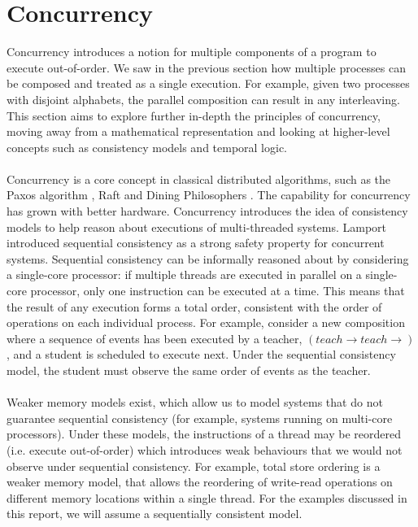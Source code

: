 \section{Concurrency} \label{sec:concurrency}
Concurrency introduces a notion for multiple components of a program to execute out-of-order. We saw in the previous section how multiple processes can be composed and treated as a single execution. For example, given two processes with disjoint alphabets, the parallel composition can result in any interleaving. This section aims to explore further in-depth the principles of concurrency, moving away from a mathematical representation and looking at higher-level concepts such as consistency models and temporal logic. 
\\ \\
Concurrency is a core concept in classical distributed algorithms, such as the Paxos algorithm \cite{basic_paxos}, Raft \cite{raft} and Dining Philosophers \cite{dining_philosophers}. The capability for concurrency has grown with better hardware. Concurrency introduces the idea of consistency models \cite{art_of_multiprocessor_programming} to help reason about executions of multi-threaded systems. Lamport introduced sequential consistency \cite{sc} as a strong safety property for concurrent systems. Sequential consistency can be informally reasoned about by considering a single-core processor: if multiple threads are executed in parallel on a single-core processor, only one instruction can be executed at a time. This means that the result of any execution forms a total order, consistent with the order of operations on each individual process. For example, consider a new composition where a sequence of events has been executed by a teacher, \((teach \rightarrow teach \rightarrow)\), and a student is scheduled to execute next. Under the sequential consistency model, the student must observe the same order of events as the teacher.
\\ \\
Weaker memory models exist, which allow us to model systems that do not guarantee sequential consistency (for example, systems running on multi-core processors). Under these models, the instructions of a thread may be reordered (i.e. execute out-of-order) which introduces weak behaviours that we would not observe under sequential consistency. For example, total store ordering is a weaker memory model, that allows the reordering of write-read operations on different memory locations within a single thread. For the examples discussed in this report, we will assume a sequentially consistent model.

